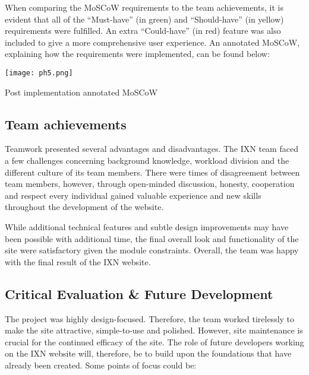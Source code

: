 \documentclass[fontsize=11pt]{extarticle}
\numberwithin{figure}{section} %
\begin{document}
When comparing the MoSCoW requirements to the team achievements, it is
evident that all of the ``Must-have'' (in green) and ``Should-have'' (in
yellow) requirements were fulfilled. An extra ``Could-have'' (in red)
feature was also included to give a more comprehensive user experience.
An annotated MoSCoW, explaining how the requirements were implemented,
can be found below:

\begin{table}[H]
      \centering
      \texttt{[image: ph5.png]}
      \caption{Post implementation annotated MoSCoW}
 \end{table}

\hypertarget{team-achievements}{%
\subsection{Team achievements}\label{team-achievements}}

Teamwork presented several advantages and disadvantages. The IXN team
faced a few challenges concerning background knowledge, workload
division and the different culture of its team members. There were times
of disagreement between team members, however, through open-minded
discussion, honesty, cooperation and respect every individual gained
valuable experience and new skills throughout the development of the
website.

While additional technical features and subtle design improvements may
have been possible with additional time, the final overall look and
functionality of the site were satisfactory given the module
constraints. Overall, the team was happy with the final result of the
IXN website.

\hypertarget{critical-evaluation-future-development}{%
\subsection{Critical Evaluation \& Future
Development}\label{critical-evaluation-future-development}}

The project was highly design-focused. Therefore, the team worked
tirelessly to make the site attractive, simple-to-use and polished.
However, site maintenance is crucial for the continued efficacy of the
site.\cite{g8} The role of future developers working on the IXN website
will, therefore, be to build upon the foundations that have already been
created. Some points of focus could be:
\end{document}
